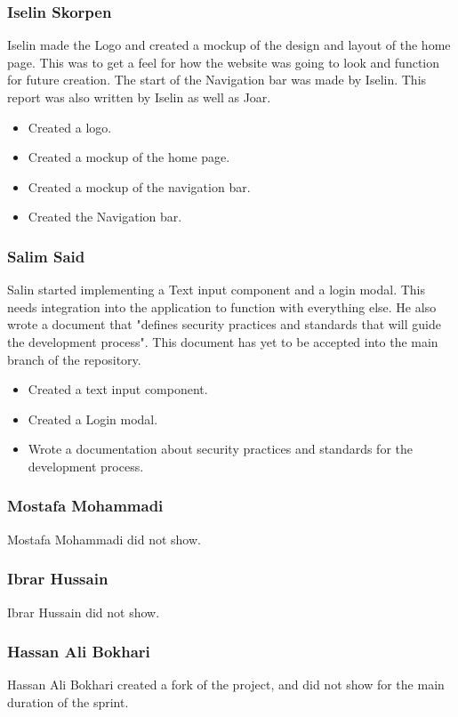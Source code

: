 \documentclass[12pt]{article}
\begin{document}
\subsubsection{Iselin Skorpen}
Iselin made the Logo and created a mockup of the design and layout of the home page. This was to get a feel for how the website was 
going to look and function for future creation. The start of the Navigation bar was made by Iselin. This report was also written by 
Iselin as well as Joar.
    \begin{itemize}
        \item Created a logo.
        \item Created a mockup of the home page.
        \item Created a mockup of the navigation bar.
        \item Created the Navigation bar.
    \end{itemize}
\subsubsection{Salim Said}
Salin started implementing a Text input component and a login modal. This needs integration into the application to function with everything 
else. He also wrote a document that "defines security practices and standards that will guide the development process"\cite*{ShowitDocsSecurity}. 
This document has yet to be accepted into the main branch of the repository.
    \begin{itemize}
        \item Created a text input component.
        \item Created a Login modal.
        \item Wrote a documentation about security practices and standards for the development process.
    \end{itemize}
\subsubsection{Mostafa Mohammadi}
Mostafa Mohammadi did not show.
\subsubsection{Ibrar Hussain}
Ibrar Hussain did not show.
\subsubsection{Hassan Ali Bokhari}
Hassan Ali Bokhari created a fork of the project, and did not show for the main duration of the sprint.
\end{document}
